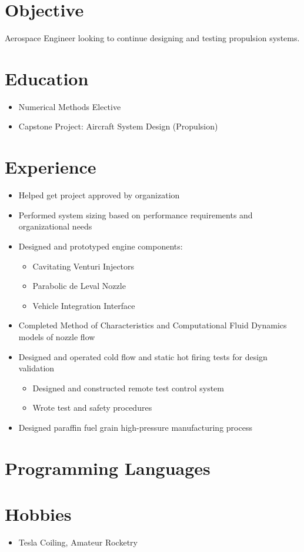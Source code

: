 \documentclass[11pt]{moderncv}
\begin{document}
\makecvtitle

\section{Objective}
Aerospace Engineer looking to continue designing and testing propulsion systems.
\section{Education}
\begin{itemize}
\item Numerical Methods Elective
\item Capstone Project: Aircraft System Design (Propulsion)
\end{itemize}
\section{Experience}
\begin{itemize}
\item Helped get project approved by organization
\item Performed system sizing based on performance requirements and organizational needs
\item Designed and prototyped engine components:
      \begin{itemize}
      \item Cavitating Venturi Injectors
      \item Parabolic de Leval Nozzle
      \item Vehicle Integration Interface
      \end{itemize}
\item Completed Method of Characteristics and Computational Fluid Dynamics models of nozzle flow
\item Designed and operated cold flow and static hot firing tests for design validation
      \begin{itemize}
      \item Designed and constructed remote test control system
      \item Wrote test and safety procedures
      \end{itemize}
\item Designed paraffin fuel grain high-pressure manufacturing process
\end{itemize}

\section{Programming Languages}

\section{Hobbies}
\begin{itemize}
\item Tesla Coiling, Amateur Rocketry
\end{itemize}
\end{document}
